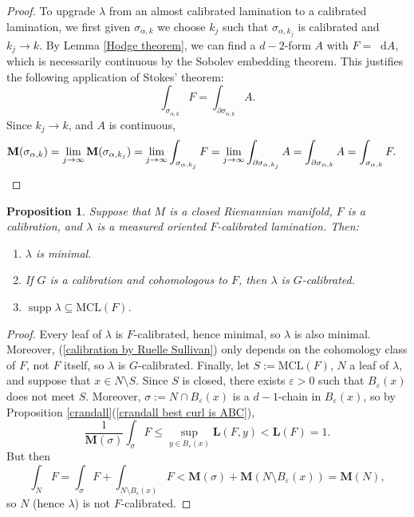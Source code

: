 \documentclass[reqno,11pt]{amsart}
\newcommand*\dif{\mathop{}\!\mathrm{d}}
\DeclareMathOperator{\supp}{supp}
\newcommand{\MCL}{\mathrm{MCL}}
\newcommand{\Mass}{\mathbf M}
\newcommand{\Comass}{\mathbf L}
\newtheorem{proposition}[theorem]{Proposition}
\theoremstyle{definition}
\numberwithin{equation}{section}
\begin{document}
\begin{proof}
To upgrade $\lambda$ from an almost calibrated lamination to a calibrated lamination, we first 
given $\sigma_{\alpha, k}$ we choose $k_j$ such that $\sigma_{\alpha, k_j}$ is calibrated and $k_j \to k$.
By Lemma \ref{Hodge theorem}, we can find a $d - 2$-form $A$ with $F = \dif A$, which is necessarily continuous by the Sobolev embedding theorem.
This justifies the following application of Stokes' theorem: 
$$\int_{\sigma_{\alpha, k}} F = \int_{\partial \sigma_{\alpha, k}} A.$$
Since $k_j \to k$, and $A$ is continuous,
\begin{align*}
\Mass(\sigma_{\alpha, k}) &= \lim_{j \to \infty} \Mass(\sigma_{\alpha, k_j}) = \lim_{j \to \infty} \int_{\sigma_{\alpha, k_j}} F = \lim_{j \to \infty} \int_{\partial \sigma_{\alpha, k_j}} A = \int_{\partial \sigma_{\alpha, k}} A = \int_{\sigma_{\alpha, k}} F. \qedhere 
\end{align*}
\end{proof}

\begin{proposition}\label{properties of calibrated laminations}
Suppose that $M$ is a closed Riemannian manifold, $F$ is a calibration, and $\lambda$ is a measured oriented $F$-calibrated lamination.
Then:
\begin{enumerate}
\item $\lambda$ is minimal.
\item If $G$ is a calibration and cohomologous to $F$, then $\lambda$ is $G$-calibrated.
\item $\supp \lambda \subseteq \MCL(F)$.
\end{enumerate}
\end{proposition}
\begin{proof}
Every leaf of $\lambda$ is $F$-calibrated, hence minimal, so $\lambda$ is also minimal.
Moreover, (\ref{calibration by Ruelle Sullivan}) only depends on the cohomology class of $F$, not $F$ itself, so $\lambda$ is $G$-calibrated.
Finally, let $S := \MCL(F)$, $N$ a leaf of $\lambda$, and suppose that $x \in N \setminus S$.
Since $S$ is closed, there exists $\varepsilon > 0$ such that $B_\varepsilon(x)$ does not meet $S$.
Moreover, $\sigma := N \cap B_\varepsilon(x)$ is a $d-1$-chain in $B_\varepsilon(x)$, so by Proposition \ref{crandall}(\ref{crandall best curl is ABC}),
$$\frac{1}{\Mass(\sigma)} \int_\sigma F \leq \sup_{y \in B_\varepsilon(x)} \Comass(F, y) < \Comass(F) = 1.$$
But then 
$$\int_N F = \int_\sigma F + \int_{N \setminus B_\varepsilon(x)} F < \Mass(\sigma) + \Mass(N \setminus B_\varepsilon(x)) = \Mass(N),$$
so $N$ (hence $\lambda$) is not $F$-calibrated.
\end{proof}
\end{document}
